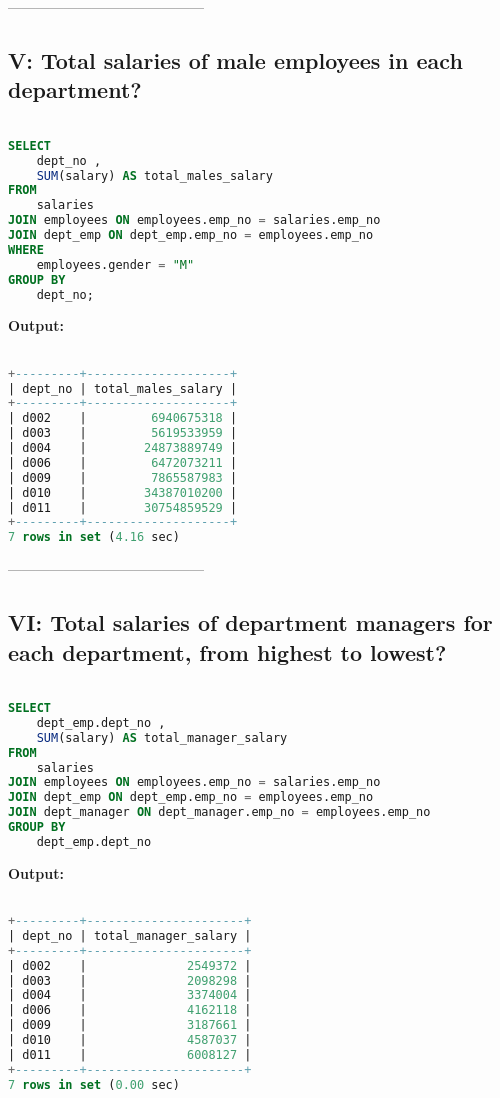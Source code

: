 \documentclass[12pt]{report}
\begin{document}
------------------------------------------

\subsection*{V: Total salaries of male employees in each department?}
\begin{lstlisting}[language=sql]

SELECT
	dept_no ,
	SUM(salary) AS total_males_salary
FROM
	salaries
JOIN employees ON employees.emp_no = salaries.emp_no
JOIN dept_emp ON dept_emp.emp_no = employees.emp_no
WHERE
	employees.gender = "M"
GROUP BY
	dept_no;

\end{lstlisting}

\textbf{Output:}

\begin{lstlisting}[language=sql]

+---------+--------------------+
| dept_no | total_males_salary |
+---------+--------------------+
| d002    |         6940675318 |
| d003    |         5619533959 |
| d004    |        24873889749 |
| d006    |         6472073211 |
| d009    |         7865587983 |
| d010    |        34387010200 |
| d011    |        30754859529 |
+---------+--------------------+
7 rows in set (4.16 sec)

\end{lstlisting}

------------------------------------------

\subsection*{VI: Total salaries of department managers for each department,
from highest to lowest?}
\begin{lstlisting}[language=sql]

SELECT
	dept_emp.dept_no ,
	SUM(salary) AS total_manager_salary
FROM
	salaries
JOIN employees ON employees.emp_no = salaries.emp_no
JOIN dept_emp ON dept_emp.emp_no = employees.emp_no
JOIN dept_manager ON dept_manager.emp_no = employees.emp_no
GROUP BY
	dept_emp.dept_no

\end{lstlisting}

\textbf{Output:}

\begin{lstlisting}[language=sql]

+---------+----------------------+
| dept_no | total_manager_salary |
+---------+----------------------+
| d002    |              2549372 |
| d003    |              2098298 |
| d004    |              3374004 |
| d006    |              4162118 |
| d009    |              3187661 |
| d010    |              4587037 |
| d011    |              6008127 |
+---------+----------------------+
7 rows in set (0.00 sec)


\end{lstlisting}
\end{document}
